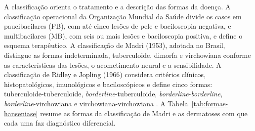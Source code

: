 A classificação orienta o tratamento e a descrição das formas da doença. A
classificação operacional da Organização Mundial da Saúde divide os casos em
paucibacilares (PB), com até cinco lesões de pele e baciloscopia negativa, e
multibacilares (MB), com seis ou mais lesões e baciloscopia positiva, e
define o esquema terapêutico. A classificação de Madri (1953), adotada no
Brasil, distingue as formas indeterminada, tuberculoide, dimorfa e
virchowiana conforme as características das lesões, o acometimento neural e a
sensibilidade. A classificação de Ridley e Jopling (1966) considera critérios
clínicos, histopatológicos, imunológicos e baciloscópicos e define cinco
formas: tuberculoide-\allowbreak tuberculoide, \textit{borderline}-\allowbreak tuberculoide,
\textit{borderline}-\allowbreak \textit{borderline}, \textit{borderline}-\allowbreak virchowiana e
virchowiana-\allowbreak virchowiana
\cite{fernandes2024}. A Tabela~\ref{tab:formas-hanseniase} resume as formas
da classificação de Madri e as dermatoses com que cada uma faz diagnóstico
diferencial.

